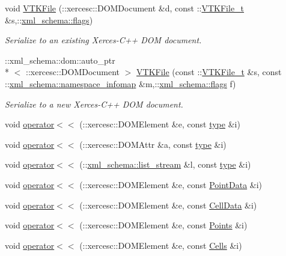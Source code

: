 \begin{DoxyCompactItemize}
void \hyperlink{vtk-unstructured_8cpp_a5303826a26dc8b0981ea314365205514}{V\-T\-K\-File} (\-::xercesc\-::\-D\-O\-M\-Document \&d, const \-::\hyperlink{classVTKFile__t}{V\-T\-K\-File\-\_\-t} \&s,\-::\hyperlink{namespacexml__schema_a8d981c127a1f5106d04ad5853e707361}{xml\-\_\-schema\-::flags})
\begin{DoxyCompactList}\small\item\em Serialize to an existing Xerces-\/\-C++ D\-O\-M document. \end{DoxyCompactList}\item 
\-::xml\-\_\-schema\-::dom\-::auto\-\_\-ptr\\*
$<$ \-::xercesc\-::\-D\-O\-M\-Document $>$ \hyperlink{vtk-unstructured_8cpp_a6e2336ff7eefc4b5fd245cc8c12815c6}{V\-T\-K\-File} (const \-::\hyperlink{classVTKFile__t}{V\-T\-K\-File\-\_\-t} \&s, const \-::\hyperlink{namespacexml__schema_ad52b6e3505153cb30ba3452f7868450e}{xml\-\_\-schema\-::namespace\-\_\-infomap} \&m,\-::\hyperlink{namespacexml__schema_a8d981c127a1f5106d04ad5853e707361}{xml\-\_\-schema\-::flags} f)
\begin{DoxyCompactList}\small\item\em Serialize to a new Xerces-\/\-C++ D\-O\-M document. \end{DoxyCompactList}\item 
void \hyperlink{vtk-unstructured_8cpp_a39982a892c5c712b9ceaf5451fc6f4ad}{operator$<$$<$} (\-::xercesc\-::\-D\-O\-M\-Element \&e, const \hyperlink{classtype}{type} \&i)
\item 
void \hyperlink{vtk-unstructured_8cpp_a4fb8d54838ba8178be88528f342c8b27}{operator$<$$<$} (\-::xercesc\-::\-D\-O\-M\-Attr \&a, const \hyperlink{classtype}{type} \&i)
\item 
void \hyperlink{vtk-unstructured_8cpp_abc84c964f7011b68cb249e0dd527a052}{operator$<$$<$} (\-::\hyperlink{namespacexml__schema_ab6c818ac91e70a25620375e0d000be83}{xml\-\_\-schema\-::list\-\_\-stream} \&l, const \hyperlink{classtype}{type} \&i)
\item 
void \hyperlink{vtk-unstructured_8cpp_a03c700ca3f77780311236cfbb43b28a6}{operator$<$$<$} (\-::xercesc\-::\-D\-O\-M\-Element \&e, const \hyperlink{classPointData}{Point\-Data} \&i)
\item 
void \hyperlink{vtk-unstructured_8cpp_a9000f9f93a0e3f8c8a2d0de1ddae77c8}{operator$<$$<$} (\-::xercesc\-::\-D\-O\-M\-Element \&e, const \hyperlink{classCellData}{Cell\-Data} \&i)
\item 
void \hyperlink{vtk-unstructured_8cpp_a155fa88f0f3a3fb5f55f06539205ef01}{operator$<$$<$} (\-::xercesc\-::\-D\-O\-M\-Element \&e, const \hyperlink{classPoints}{Points} \&i)
\item 
void \hyperlink{vtk-unstructured_8cpp_a043b0bbda942e0878ce7a8f63ddefe79}{operator$<$$<$} (\-::xercesc\-::\-D\-O\-M\-Element \&e, const \hyperlink{classCells}{Cells} \&i)
\end{DoxyCompactItemize}


